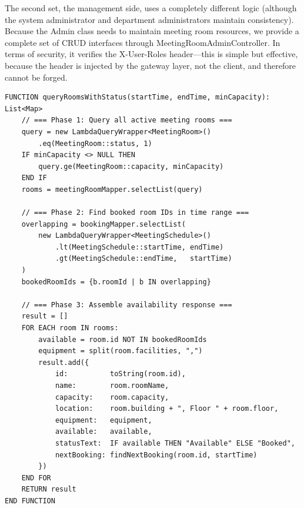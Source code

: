 The second set, the management side, uses a completely different logic (although the system administrator and department administrators maintain consistency). Because the Admin class needs to maintain meeting room resources, we provide a complete set of CRUD interfaces through MeetingRoomAdminController. In terms of security, it verifies the X-User-Roles header---this is simple but effective, because the header is injected by the gateway layer, not the client, and therefore cannot be forged.

\vspace{3mm}

\begin{table}[H]
\small\singlespacing
\centering
\caption{Pseudocode --- queryRoomsWithStatus() Three-Phase Room Availability Algorithm}
\label{tab:pseudocode-query-rooms}
\vspace{2mm}

\begin{lstlisting}
FUNCTION queryRoomsWithStatus(startTime, endTime, minCapacity): List<Map>
    // === Phase 1: Query all active meeting rooms ===
    query = new LambdaQueryWrapper<MeetingRoom>()
        .eq(MeetingRoom::status, 1)
    IF minCapacity <> NULL THEN
        query.ge(MeetingRoom::capacity, minCapacity)
    END IF
    rooms = meetingRoomMapper.selectList(query)

    // === Phase 2: Find booked room IDs in time range ===
    overlapping = bookingMapper.selectList(
        new LambdaQueryWrapper<MeetingSchedule>()
            .lt(MeetingSchedule::startTime, endTime)
            .gt(MeetingSchedule::endTime,   startTime)
    )
    bookedRoomIds = {b.roomId | b IN overlapping}

    // === Phase 3: Assemble availability response ===
    result = []
    FOR EACH room IN rooms:
        available = room.id NOT IN bookedRoomIds
        equipment = split(room.facilities, ",")
        result.add({
            id:          toString(room.id),
            name:        room.roomName,
            capacity:    room.capacity,
            location:    room.building + ", Floor " + room.floor,
            equipment:   equipment,
            available:   available,
            statusText:  IF available THEN "Available" ELSE "Booked",
            nextBooking: findNextBooking(room.id, startTime)
        })
    END FOR
    RETURN result
END FUNCTION
\end{lstlisting}
\end{table}


\vspace{3mm}

